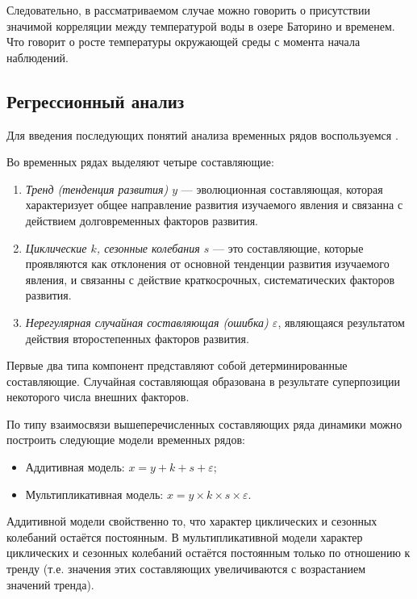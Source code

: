 Следовательно, в рассматриваемом случае можно говорить о присутствии значимой корреляции между температурой воды в озере Баторино и временем. Что говорит о росте температуры окружающей среды с момента начала наблюдений.


\subsection{Регрессионный анализ} %
\label{sec:regr_analysis}

Для введения последующих понятий анализа временных рядов воспользуемся \cite{Eddows1997}.

Во временных рядах выделяют четыре составляющие:
\begin{enumerate}
	\item \textit{Тренд (тенденция развития) $ y $} --- эволюционная составляющая, которая характеризует общее направление развития изучаемого явления и связанна с действием долговременных факторов развития.
	\item \textit{Циклические $ k $, сезонные колебания $ s $} --- это составляющие, которые проявляются как отклонения от основной тенденции развития изучаемого явления, и связанны с действие краткосрочных, систематических факторов развития.
	\item \textit{Нерегулярная случайная составляющая (ошибка) $ \varepsilon $}, являющаяся результатом действия второстепенных факторов развития.
\end{enumerate}
Первые два типа компонент представляют собой детерминированные составляющие. Случайная составляющая образована в результате суперпозиции некоторого числа внешних факторов.

По типу взаимосвязи вышеперечисленных составляющих ряда динамики можно построить следующие модели временных рядов:
\begin{itemize}
	\item Аддитивная модель: $ x = y + k + s + \varepsilon $;
	\item Мультипликативная модель: $x = y \times k \times s \times \varepsilon$.
\end{itemize}

Аддитивной модели свойственно то, что характер циклических и сезонных колебаний остаётся постоянным. В мультипликативной модели характер циклических и сезонных колебаний остаётся постоянным только по отношению к тренду (т.е. значения этих составляющих увеличиваются с возрастанием значений тренда).

